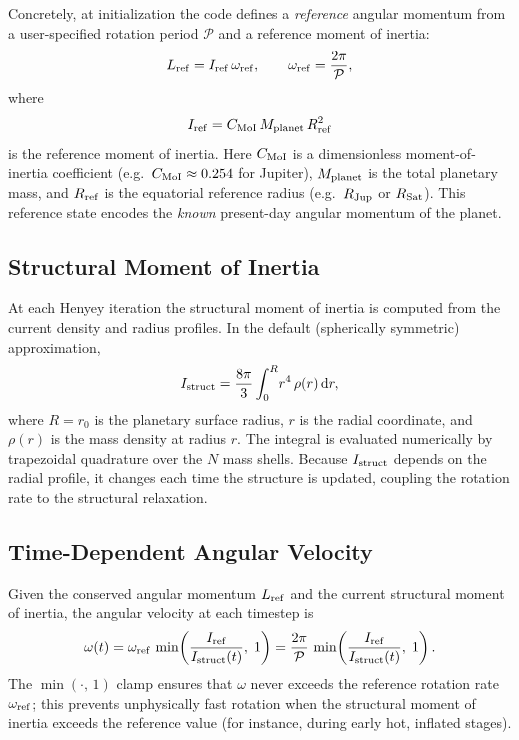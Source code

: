 \documentclass{aastex631}
\newcommand{\dd}{\mathrm{d}}
\begin{document}
Concretely, at initialization the code defines a \emph{reference}
angular momentum from a user-specified rotation period $\mathcal{P}$
and a reference moment of inertia:
\begin{equation}\label{eq:Lref}
  L_{\rm ref} = I_{\rm ref}\,\omega_{\rm ref},
  \qquad
  \omega_{\rm ref} = \frac{2\pi}{\mathcal{P}},
\end{equation}
where
\begin{equation}\label{eq:Iref}
  I_{\rm ref} = C_{\rm MoI}\,M_{\rm planet}\,R_{\rm ref}^2
\end{equation}
is the reference moment of inertia.  Here $C_{\rm MoI}$ is a
dimensionless moment-of-inertia coefficient (e.g.\ $C_{\rm MoI}
\approx 0.254$ for Jupiter), $M_{\rm planet}$ is the total planetary
mass, and $R_{\rm ref}$ is the equatorial reference radius (e.g.\
$R_{\rm Jup}$ or $R_{\rm Sat}$).  This reference state encodes the
\emph{known} present-day angular momentum of the planet.

\subsection{Structural Moment of Inertia}\label{sec:Istruct}

At each Henyey iteration the structural moment of inertia is computed
from the current density and radius profiles.  In the default
(spherically symmetric) approximation,
\begin{equation}\label{eq:Istruct}
  I_{\rm struct} = \frac{8\pi}{3}\int_0^{R}\!r^4\,\rho(r)\,\dd r,
\end{equation}
where $R = r_0$ is the planetary surface radius, $r$ is the radial
coordinate, and $\rho(r)$ is the mass density at radius $r$.  The
integral is evaluated numerically by trapezoidal quadrature over the
$N$ mass shells.  Because $I_{\rm struct}$ depends on the radial
profile, it changes each time the structure is updated, coupling
the rotation rate to the structural relaxation.

\subsection{Time-Dependent Angular Velocity}\label{sec:omega_time}

Given the conserved angular momentum $L_{\rm ref}$ and the current
structural moment of inertia, the angular velocity at each timestep is
\begin{equation}\label{eq:omega}
  \omega(t)
  = \omega_{\rm ref}\,
    \min\!\left(\frac{I_{\rm ref}}{I_{\rm struct}(t)},\;1\right)
  = \frac{2\pi}{\mathcal{P}}\,
    \min\!\left(\frac{I_{\rm ref}}{I_{\rm struct}(t)},\;1\right).
\end{equation}
The $\min(\cdot,\,1)$ clamp ensures that $\omega$ never exceeds the
reference rotation rate $\omega_{\rm ref}$; this prevents unphysically
fast rotation when the structural moment of inertia exceeds the
reference value (for instance, during early hot, inflated stages).
\end{document}
